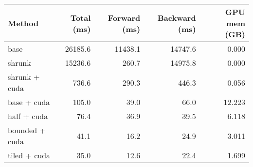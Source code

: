 \begin{tabular}{lrrrr}
\hline
 Method         &   Total (ms) &   Forward (ms) &   Backward (ms) &   GPU mem (GB) \\
\hline
 base           &      26185.6 &        11438.1 &         14747.6 &          0.000 \\
 shrunk         &      15236.6 &          260.7 &         14975.8 &          0.000 \\
 shrunk + cuda  &        736.6 &          290.3 &           446.3 &          0.056 \\
 base + cuda    &        105.0 &           39.0 &            66.0 &         12.223 \\
 half + cuda    &         76.4 &           36.9 &            39.5 &          6.118 \\
 bounded + cuda &         41.1 &           16.2 &            24.9 &          3.011 \\
 tiled + cuda   &         35.0 &           12.6 &            22.4 &          1.699 \\
\hline
\end{tabular}
